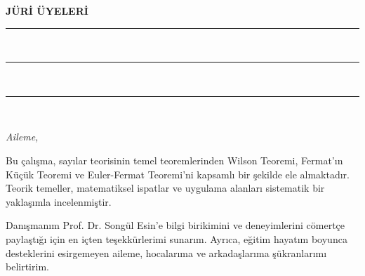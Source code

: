 \vspace{3cm}

\noindent\textbf{JÜRİ ÜYELERİ}\\ 

\vspace{1cm}

  \hfill
\rule{4.5cm}{.25mm}\\ \vspace{1cm}

 \hfill 
\rule{4.5cm}{.25mm}\\ \vspace{1cm}

 \hfill
\rule{4.5cm}{.25mm}\\   \vspace{3cm}



\newpage

\newpage
\phantom{Dedication} \vspace{7.5cm}
\begin{center}
\emph{Aileme,}
\end{center}


\newpage
\phantom{omur} 

\begin{flushleft}
\end{flushleft}
\vspace{1.75cm}

\noindent Bu çalışma, sayılar teorisinin temel teoremlerinden Wilson Teoremi, Fermat'ın Küçük Teoremi ve Euler-Fermat Teoremi'ni kapsamlı bir şekilde ele almaktadır. Teorik temeller, matematiksel ispatlar ve uygulama alanları sistematik bir yaklaşımla incelenmiştir.

Danışmanım Prof. Dr. Songül Esin'e bilgi birikimini ve deneyimlerini cömertçe paylaştığı için en içten teşekkürlerimi sunarım. Ayrıca, eğitim hayatım boyunca desteklerini esirgemeyen aileme, hocalarıma ve arkadaşlarıma şükranlarımı belirtirim.





